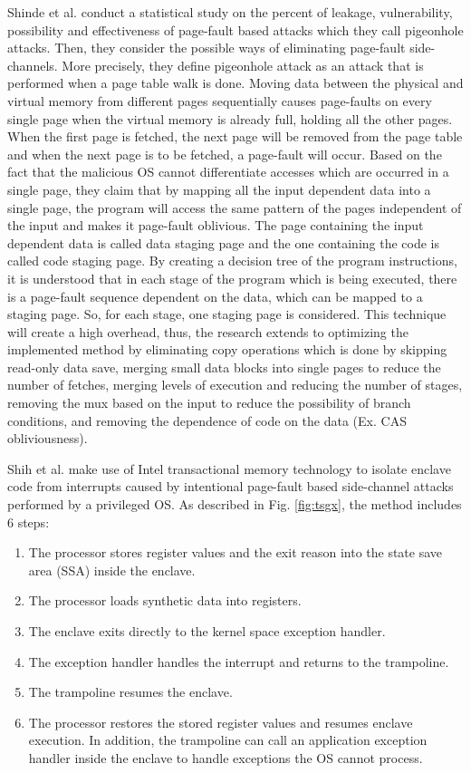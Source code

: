 Shinde et al. \cite{pigeonhole} conduct a statistical study on the percent of leakage, vulnerability, possibility and effectiveness of page-fault based attacks which they call pigeonhole attacks. Then, they consider the possible ways of eliminating page-fault side-channels. More precisely, they define pigeonhole attack as an attack that is performed when a page table walk is done. Moving data between the physical and virtual memory from different pages sequentially causes page-faults on every single page when the virtual memory is already full, holding all the other pages. When the first page is fetched, the next page will be removed from the page table and when the next page is to be fetched, a page-fault will occur. Based on the fact that the malicious OS cannot differentiate accesses which are occurred in a single page, they claim that by mapping all the input dependent data into a single page, the program will access the same pattern of the pages independent of the input and makes it page-fault oblivious. The page containing the input dependent data is called data staging page and the one containing the code is called code staging page. By creating a decision tree of the program instructions, it is understood that in each stage of the program which is being executed, there is a page-fault sequence dependent on the data, which can be mapped to a staging page. So, for each stage, one staging page is considered. This technique will create a high overhead, thus, the research extends to optimizing the implemented method by eliminating copy operations which is done by skipping read-only data save, merging small data blocks into single pages to reduce the number of fetches, merging levels of execution and reducing the number of stages, removing the mux based on the input to reduce the possibility of branch conditions, and removing the dependence of code on the data (Ex. CAS obliviousness).

Shih et al. \cite{tsgx} make use of Intel transactional memory technology to isolate enclave code from interrupts caused by intentional page-fault based side-channel attacks performed by a privileged OS. As described in Fig. \ref{fig:tsgx}, the method includes 6 steps:
\begin{enumerate}
	\item The processor stores register values and the exit reason into the state save area (SSA) inside the enclave.
	\item The processor loads synthetic	data into registers.
	\item The enclave exits directly to the kernel space exception handler.
	\item The exception handler handles the interrupt and returns to the trampoline.
	\item The trampoline resumes the enclave.
	\item The processor restores the stored register values and resumes enclave execution. In addition, the trampoline can call an application exception handler inside the enclave to handle exceptions the OS cannot process.
\end{enumerate}


